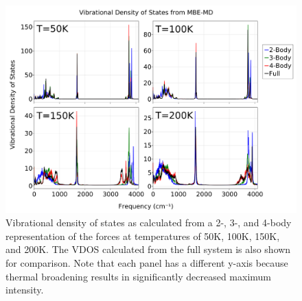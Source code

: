 \documentclass[11pt, proquest]{uwthesis}[2020/02/24]
\begin{document}
\begin{figure}[t]
\uwsinglespace
\begin{center}
\begin{minipage}{0.9\textwidth}
\includegraphics[width=\textwidth]{Figures/Chapter_4/ch4_figure_4.png}
\end{minipage}
\end{center}
\caption[Vibrational density of states as calculated from a 2-, 3-, and 4-body representation of the forces at temperatures of 50K, 100K, 150K, and 200K. The VDOS calculated from the full system is also shown for comparison. Note that each panel has a different y-axis because thermal broadening results in significantly decreased maximum intensity.]{Vibrational density of states as calculated from a 2-, 3-, and 4-body representation of the forces at temperatures of 50K, 100K, 150K, and 200K. The VDOS calculated from the full system is also shown for comparison. Note that each panel has a different y-axis because thermal broadening results in significantly decreased maximum intensity.}
\label{fig:MBE_MD_F4}
\end{figure}
\end{document}
